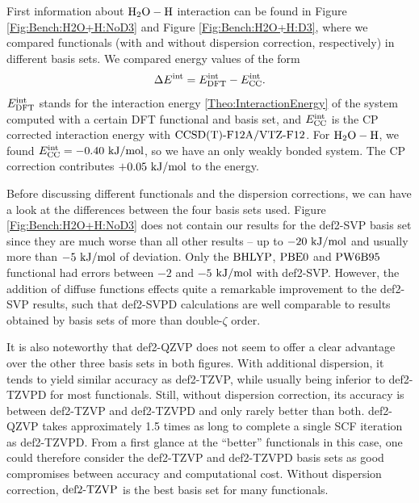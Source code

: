 \documentclass[8.5pt,twoside,twocolumn]{article}
\newcommand\eint{\enmat{E^{\te{int}}}}
\newcommand\dft{\enmat{_{\te{DFT}}}}
\newcommand\kmo{\enmat{\te {kJ/mol}}}
\theoremstyle{standard}
\begin{document}
First information about $\mbox{\ensuremath{\text H _2 \text O-\text H}}$ interaction can be found in Figure \ref{Fig:Bench:H2O+H:NoD3}
and Figure \ref{Fig:Bench:H2O+H:D3}, where
we compared functionals (with and without dispersion correction, respectively) in different basis sets. We compared
energy values of the form
\newcommand\ecc{\enmat{\eint_{\te {CC}}}}
\begin{equation}
\Dl\eint=\eint\dft-\ecc.
\label{Bench:RefEnergy}
\end{equation}
$\eint\dft$ stands for the interaction energy \eqref{Theo:InteractionEnergy} of the system computed with a certain
DFT functional and basis set, and $\ecc$ is the CP corrected interaction energy with $\text{CCSD(T)-F12A}/\text{VTZ-F}12$.
For $\mbox{\ensuremath{\text H _2 \text O-\text H}}$, we found \mbox{$\ecc=-0.40\ \kmo$}, so we have an only
weakly bonded system. The CP correction contributes $+0.05\ \kmo$ to
the energy.

Before discussing different functionals and the dispersion corrections, we can have a look
at the differences between the four basis sets used. Figure
\ref{Fig:Bench:H2O+H:NoD3} does not contain our results for the def2-SVP basis
set since they are much worse than all other results -- up to $-20\ \kmo$ and
usually more than $-5\ \kmo$ of deviation. Only the $\text{BHLYP}$, $\text{PBE0}$ and $\text{PW6B95}$
functional had errors between $-2$ and $-5$ $\kmo$ with def2-SVP. However, the
addition of diffuse functions effects quite a remarkable improvement to the
def2-SVP results, such that def2-SVPD calculations are well comparable to
results obtained by basis sets of more than double-$\zeta$ order.

It is also
noteworthy that def2-QZVP does not seem to offer a clear advantage over the
other three basis sets in both figures. With additional dispersion,
it tends to yield similar accuracy as def2-TZVP, while usually being inferior
to def2-TZVPD for most functionals. Still, without dispersion correction,
its accuracy is between def2-TZVP and def2-TZVPD and only rarely better
than both. def2-QZVP takes approximately 1.5 times as long to complete a single
SCF iteration as def2-TZVPD. From a first glance
at the ``better'' functionals in this case, one could therefore consider
the def2-TZVP and def2-TZVPD basis sets as good compromises between
accuracy and computational cost. Without dispersion correction, $\text{def2-TZVP}$
is the best basis set for many functionals.
\end{document}
